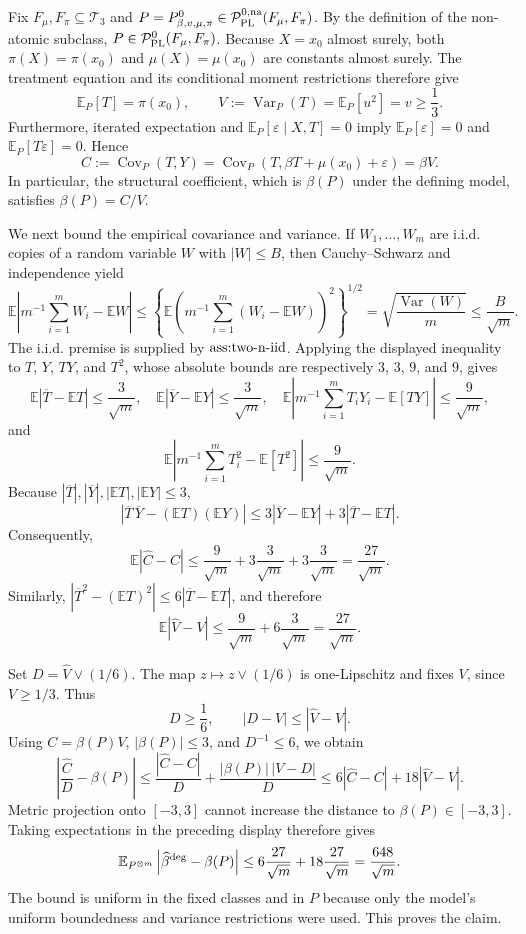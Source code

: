 Fix \(F_\mu,F_\pi\subseteq\mathcal T_3\) and \(P=P^0_{\beta,v,\mu,\pi}\in\mathcal P_{\rm PL}^{0,\rm na}(F_\mu,F_\pi)\). By the definition of the non-atomic subclass, \(P\in\mathcal P_{\rm PL}^{0}(F_\mu,F_\pi)\). Because \(X=x_0\) almost surely, both \(\pi(X)=\pi(x_0)\) and \(\mu(X)=\mu(x_0)\) are constants almost surely. The treatment equation and its conditional moment restrictions therefore give
\[
\mathbb E_P[T]=\pi(x_0),\qquad V:=\operatorname{Var}_P(T)=\mathbb E_P[u^2]=v\ge \frac13.
\]
Furthermore, iterated expectation and \(\mathbb E_P[\varepsilon\mid X,T]=0\) imply \(\mathbb E_P[\varepsilon]=0\) and \(\mathbb E_P[T\varepsilon]=0\). Hence
\[
C:=\operatorname{Cov}_P(T,Y)
=\operatorname{Cov}_P\!\left(T,\beta T+\mu(x_0)+\varepsilon\right)
=\beta V.
\]
In particular, the structural coefficient, which is \(\beta(P)\) under the defining model, satisfies \(\beta(P)=C/V\).

We next bound the empirical covariance and variance. If \(W_1,\ldots,W_m\) are i.i.d. copies of a random variable \(W\) with \(|W|\le B\), then Cauchy--Schwarz and independence yield
\[
\mathbb E\left|m^{-1}\sum_{i=1}^mW_i-\mathbb EW\right|
\le \left\{\mathbb E\left(m^{-1}\sum_{i=1}^m(W_i-\mathbb EW)\right)^2\right\}^{1/2}
=\sqrt{\frac{\operatorname{Var}(W)}m}
\le \frac{B}{\sqrt m}.
\]
The i.i.d. premise is supplied by \(\textnormal{ass:two-n-iid}\). Applying the displayed inequality to \(T\), \(Y\), \(TY\), and \(T^2\), whose absolute bounds are respectively \(3\), \(3\), \(9\), and \(9\), gives
\[
\mathbb E|\overline T-\mathbb ET|\le\frac3{\sqrt m},\quad
\mathbb E|\overline Y-\mathbb EY|\le\frac3{\sqrt m},\quad
\mathbb E\left|m^{-1}\sum_{i=1}^mT_iY_i-\mathbb E[TY]\right|\le\frac9{\sqrt m},
\]
and
\[
\mathbb E\left|m^{-1}\sum_{i=1}^mT_i^2-\mathbb E[T^2]\right|\le\frac9{\sqrt m}.
\]
Because \(|\overline T|,|\overline Y|,|\mathbb ET|,|\mathbb EY|\le3\),
\[
|\overline T\,\overline Y-(\mathbb ET)(\mathbb EY)|
\le 3|\overline Y-\mathbb EY|+3|\overline T-\mathbb ET|.
\]
Consequently,
\[
\mathbb E|\widehat C-C|
\le \frac9{\sqrt m}+3\frac3{\sqrt m}+3\frac3{\sqrt m}
=\frac{27}{\sqrt m}.
\]
Similarly, \(|\overline T^2-(\mathbb ET)^2|\le6|\overline T-\mathbb ET|\), and therefore
\[
\mathbb E|\widehat V-V|
\le \frac9{\sqrt m}+6\frac3{\sqrt m}
=\frac{27}{\sqrt m}.
\]

Set \(D=\widehat V\vee(1/6)\). The map \(z\mapsto z\vee(1/6)\) is one-Lipschitz and fixes \(V\), since \(V\ge1/3\). Thus
\[
D\ge\frac16,\qquad |D-V|\le|\widehat V-V|.
\]
Using \(C=\beta(P)V\), \(|\beta(P)|\le3\), and \(D^{-1}\le6\), we obtain
\[
\left|\frac{\widehat C}{D}-\beta(P)\right|
\le \frac{|\widehat C-C|}{D}+\frac{|\beta(P)|\,|V-D|}{D}
\le6|\widehat C-C|+18|\widehat V-V|.
\]
Metric projection onto \([-3,3]\) cannot increase the distance to \(\beta(P)\in[-3,3]\). Taking expectations in the preceding display therefore gives
\[
\mathbb E_{P^{\otimes m}}\left|\widehat\beta^{\rm deg}-\beta(P)\right|
\le6\frac{27}{\sqrt m}+18\frac{27}{\sqrt m}
=\frac{648}{\sqrt m}.
\]
The bound is uniform in the fixed classes and in \(P\) because only the model's uniform boundedness and variance restrictions were used. This proves the claim.